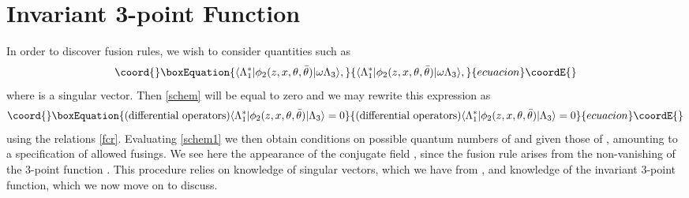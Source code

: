 \documentclass[a4paper,12pt]{article}
\def\thetabar    {\bar{\theta}}
\def\fsl         {sl(2|1;\mathbb C)}
\def\hslck       {\hat{sl}(2|1;{\mathbb C})_k}
\begin{document}
\section{\coordHE{} Invariant 3-point Function}


In order to discover \myHighlight{$\hslck$}\coordHE{} fusion rules, we wish to consider
quantities such as 
\begin{equation}\coord{}\boxEquation{
\label{schem}
\langle \Lambda^*_1 | \phi_2(z,x,\theta,\thetabar) | \omega
\Lambda_3 \rangle,
}{
\langle \Lambda^*_1 | \phi_2(z,x,\theta,\thetabar) | \omega
\Lambda_3 \rangle,
}{ecuacion}\coordE{}\end{equation}
where \myHighlight{$\omega\Lambda$}\coordHE{} is a singular vector.  Then \eqref{schem} will
be equal to zero and we may rewrite this expression as
\begin{equation}\coord{}\boxEquation{
\label{schem1}
(\textrm{differential operators})\langle \Lambda^*_1 |
\phi_2(z,x,\theta,\thetabar) | \Lambda_3 \rangle = 0
}{
(\textrm{differential operators})\langle \Lambda^*_1 |
\phi_2(z,x,\theta,\thetabar) | \Lambda_3 \rangle = 0
}{ecuacion}\coordE{}\end{equation}
using the relations \eqref{fcr}.  Evaluating \eqref{schem1} we then
obtain conditions on possible quantum numbers of \coordHE{} and
\coordHE{} given those of \coordHE{}, amounting to a specification
of allowed fusings.  We see here the appearance of the conjugate field 
\coordHE{}, since the fusion rule \coordHE{} arises from 
the non-vanishing of the 3-point function \coordHE{}.
This procedure relies on knowledge of \myHighlight{$\hslck$}\coordHE{}
singular vectors, which we have from \cite{BT97}, and knowledge of the
\myHighlight{$\fsl$}\coordHE{} invariant 3-point function, which we now move on to
discuss.
\end{document}
